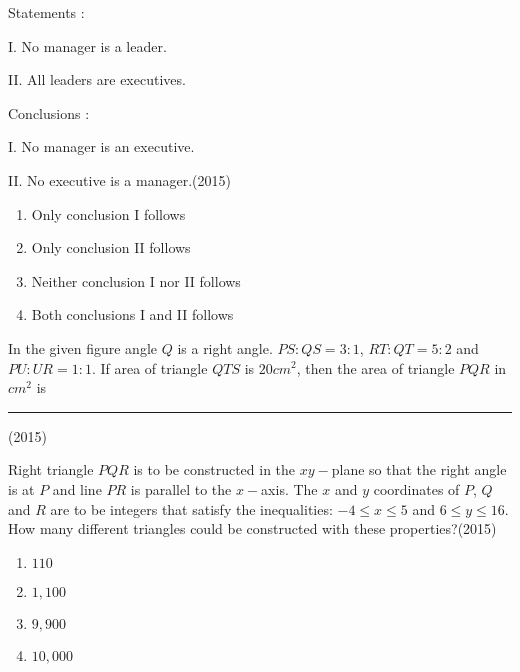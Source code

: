 Statements :

\textsc{I}. No manager is a leader.

\textsc{II}. All leaders are executives.

Conclusions :

\textsc{I}. No manager is an executive.

\textsc{II}. No executive is a manager.\hfill(2015)

\begin{multicols}{2}
\begin{enumerate}
\item Only conclusion \textsc{I} follows
\item Only conclusion \textsc{II} follows
\item Neither conclusion \textsc{I} nor \textsc{II} follows
\item Both conclusions \textsc{I} and \textsc{II} follows
\end{enumerate}
\end{multicols}


\item In the given figure angle $Q$ is a right angle. $PS:QS=3:1$, $RT:QT=5:2$ and $PU:UR=1:1$. If area of triangle $QTS$ is $20cm^{2}$, then the area of triangle $PQR$ in $cm^{2}$ is \rule{1cm}{0.15mm}\hfill(2015)



\item Right triangle $PQR$ is to be constructed in the $xy-$plane so that the right angle is at $P$ and line $PR$ is parallel to the $x-$axis. The $x$ and $y$ coordinates of $P$, $Q$ and $R$ are to be integers that satisfy the inequalities: $-4\leq x\leq 5$ and $6\leq y\leq 16$. How many different triangles could be constructed with these properties?\hfill(2015)
\begin{multicols}{2}
\begin{enumerate}
\item $110$
\item $1,100$
\item $9,900$
\item $10,000$
\end{enumerate}
\end{multicols}


